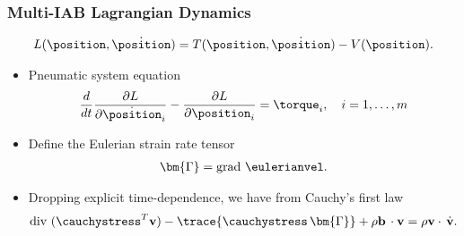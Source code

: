 \begin{frame}
	\frametitle{Multi-IAB Lagrangian Dynamics}
	\begin{align}
	L(\position, \dot{\position}) = T(\position, \dot{\position}) - V(\position).
	\label{eq:lagrange}
	\end{align}
	\begin{itemize}
		\item Pneumatic system equation
		\begin{align}
		\dfrac{d}{dt}\dfrac{\partial L}{\partial \dot{\position}_i} - \dfrac{\partial L}{\partial \position_i} = \torque_i, \quad i = 1, \ldots, m
		\label{eq:lagrange_compo}
		\end{align}
		\item Define the Eulerian strain rate tensor 
		\begin{align}
		\bm{\Gamma} = \text{grad } \eulerianvel.
		\end{align}
		\item Dropping explicit time-dependence, we have from Cauchy's first law
		\begin{align}
		\text{div } (\cauchystress^T \textbf{v}) - \trace{\cauchystress\,\bm{\Gamma}} + \rho \textbf{b} \,\cdot \textbf{v} = \rho \textbf{v} \cdot \, \dot{\textbf{v}}.
		\end{align}
	\end{itemize}
\end{frame}

